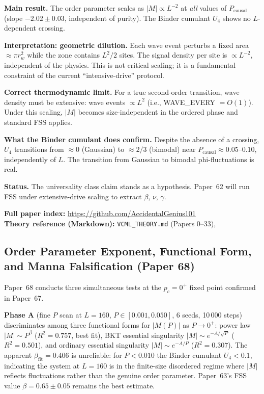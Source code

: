 \documentclass[11pt]{article}
\begin{document}
\textbf{Main result.}
The order parameter scales as $|M| \propto L^{-2}$ at \emph{all} values of
$P_\mathrm{causal}$ (slope $-2.02 \pm 0.03$, independent of purity).
The Binder cumulant $U_4$ shows no $L$-dependent crossing.

\textbf{Interpretation: geometric dilution.}
Each wave event perturbs a fixed area $\approx \pi r_w^2$ while the zone
contains $L^2/2$ sites.
The signal density per site is $\propto L^{-2}$, independent of the physics.
This is not critical scaling; it is a fundamental constraint of the current
``intensive-drive'' protocol.

\textbf{Correct thermodynamic limit.}
For a true second-order transition, wave density must be extensive:
wave events $\propto L^2$ (i.e., WAVE\_EVERY $= O(1)$).
Under this scaling, $|M|$ becomes size-independent in the ordered phase
and standard FSS applies.

\textbf{What the Binder cumulant does confirm.}
Despite the absence of a crossing, $U_4$ transitions from $\approx 0$ (Gaussian)
to $\approx 2/3$ (bimodal) near $P_\mathrm{causal} \approx 0.05$--$0.10$,
independently of $L$.
The transition from Gaussian to bimodal phi-fluctuations is real.

\textbf{Status.}
The universality class claim stands as a hypothesis.
Paper~62 will run FSS under extensive-drive scaling to extract $\beta$, $\nu$, $\gamma$.

\bigskip
\noindent\textbf{Full paper index:} \url{https://github.com/AccidentalGenius101}\\
\noindent\textbf{Theory reference (Markdown):} \texttt{VCML\_THEORY.md} (Papers 0--33),

\subsection{Order Parameter Exponent, Functional Form, and Manna Falsification (Paper 68)}

Paper~68 conducts three simultaneous tests at the $p_c=0^+$ fixed point confirmed
in Paper~67.

\textbf{Phase A} (fine $P$ scan at $L=160$, $P\in[0.001,0.050]$, 6 seeds, 10\,000 steps)
discriminates among three functional forms for $|M(P)|$ as $P\to0^+$:
power law $|M|\sim P^\beta$ ($R^2=0.757$, best fit), BKT essential singularity
$|M|\sim e^{-A/\sqrt{P}}$ ($R^2=0.501$), and ordinary essential singularity
$|M|\sim e^{-A/P}$ ($R^2=0.307$).
The apparent $\beta_\mathrm{fit}=0.406$ is unreliable: for $P<0.010$ the Binder
cumulant $U_4<0.1$, indicating the system at $L=160$ is in the finite-size
disordered regime where $|M|$ reflects fluctuations rather than the genuine
order parameter.
Paper~63's FSS value $\beta=0.65\pm0.05$ remains the best estimate.
\end{document}
